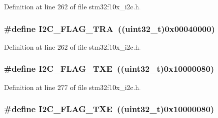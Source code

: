 Definition at line 262 of file stm32f10x\+\_\+i2c.\+h.

\subsubsection[{\texorpdfstring{I2\+C\+\_\+\+F\+L\+A\+G\+\_\+\+T\+RA}{I2C_FLAG_TRA}}]{\setlength{\rightskip}{0pt plus 5cm}\#define I2\+C\+\_\+\+F\+L\+A\+G\+\_\+\+T\+RA~(({\bf uint32\+\_\+t})0x00040000)}\hypertarget{group___i2_c__flags__definition_ga0359a5f960670d51cb17e659d32498ea}{}\label{group___i2_c__flags__definition_ga0359a5f960670d51cb17e659d32498ea}


Definition at line 262 of file stm32f10x\+\_\+i2c.\+h.

\subsubsection[{\texorpdfstring{I2\+C\+\_\+\+F\+L\+A\+G\+\_\+\+T\+XE}{I2C_FLAG_TXE}}]{\setlength{\rightskip}{0pt plus 5cm}\#define I2\+C\+\_\+\+F\+L\+A\+G\+\_\+\+T\+XE~(({\bf uint32\+\_\+t})0x10000080)}\hypertarget{group___i2_c__flags__definition_gaeda14a3e9d02ff20a0d001bba9328f3d}{}\label{group___i2_c__flags__definition_gaeda14a3e9d02ff20a0d001bba9328f3d}


Definition at line 277 of file stm32f10x\+\_\+i2c.\+h.

\subsubsection[{\texorpdfstring{I2\+C\+\_\+\+F\+L\+A\+G\+\_\+\+T\+XE}{I2C_FLAG_TXE}}]{\setlength{\rightskip}{0pt plus 5cm}\#define I2\+C\+\_\+\+F\+L\+A\+G\+\_\+\+T\+XE~(({\bf uint32\+\_\+t})0x10000080)}\hypertarget{group___i2_c__flags__definition_gaeda14a3e9d02ff20a0d001bba9328f3d}{}\label{group___i2_c__flags__definition_gaeda14a3e9d02ff20a0d001bba9328f3d}



